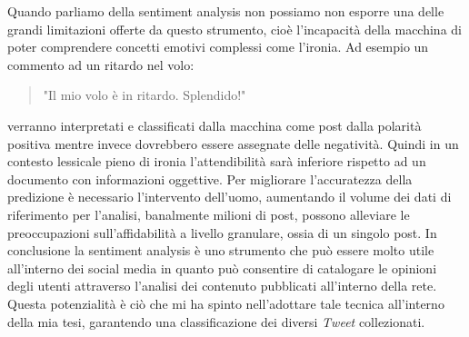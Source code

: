 Quando parliamo della sentiment analysis non possiamo non esporre una delle grandi limitazioni offerte da questo strumento, cioè l'incapacità della macchina di poter comprendere concetti emotivi complessi come l'ironia.
Ad esempio un commento ad un ritardo nel volo:
\begin{quote}
"Il mio volo è in ritardo. Splendido!"
\end{quote}
verranno interpretati e classificati dalla macchina come post dalla polarità positiva mentre invece dovrebbero essere assegnate delle negatività. Quindi in un contesto lessicale pieno di ironia l'attendibilità sarà inferiore rispetto ad un documento con informazioni oggettive.
Per migliorare l'accuratezza della predizione è necessario l'intervento dell'uomo, aumentando il volume dei dati di riferimento per l'analisi, banalmente milioni di post, possono alleviare le preoccupazioni sull'affidabilità a livello granulare, ossia di un singolo post.
In conclusione la sentiment analysis è uno strumento che può essere molto utile all'interno dei social media in quanto può consentire di catalogare le opinioni degli utenti attraverso l'analisi dei contenuto pubblicati all'interno della rete. Questa potenzialità è ciò che mi ha spinto nell'adottare tale tecnica all'interno della mia tesi, garantendo una  classificazione dei diversi \textit{Tweet} collezionati.

\begin{comment}
La sentiment analysis può essere sviluppata seguendo 4 approcci differenti:
\begin{itemize}
\item \textit{Spotting di parole chiave}: il testo viene classificato da categorie influenti basate sulla presenza di parole influenti come contento, triste, impaurito, annoiato.
\item \textit{Affinità lessicale}: oltre a rilevare le parole influenzanti, assegna arbitrariamente alle parole una probabile affinità a emozioni particolari. 
\item \textit{Metodi statistici}:  questo approccio si basa sugli elementi trattati dal machine learning come analisi semantica latente, macchine a vettori di supporto, bag of words. Partendo da questi elementi per estrarre le opinioni in un contesto e ottenerne delle caratteristiche, vengono utilizzate delle relazioni grammaticali tra le parole. Le relazioni sono ottenute da un'analisi sintattica e profonda del testo.
\item \textit{Tecniche di livello concettuale}: utilizza gli elementi della rappresentazione della conoscenza come le \textit{ontologie} e le \textit{reti semantiche}, riuscendo a rilevare semantiche che sono espresse in maniera sottile all'interno del testo.
\end{itemize}
In conclusione la sentiment analysis è uno strumento che può essere molto utile all'interno dei social media in quanto può consentire di catalogare le opinioni degli utenti attraverso l'analisi dei contenuto pubblicati all'interno della rete. Questa potenzialità è ciò che mi ha spinto nell'adottare tale tecnica all'interno della mia tesi.
\end{comment}

